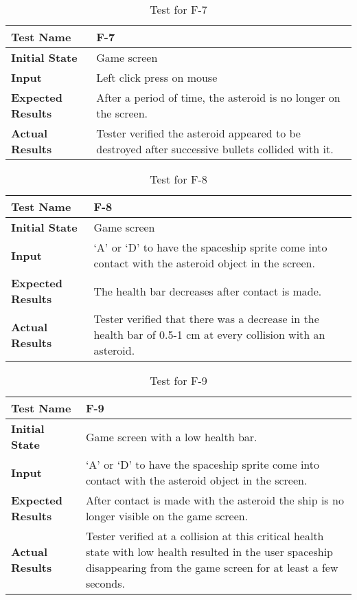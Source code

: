 \documentclass[12pt, titlepage]{article}
\begin{document}
\begin{table}[!htbp]
\begin{tabular}[r]{|l|l|}\hline
\textbf{Test Name} & F-7 \\ \hline
\textbf{Initial State} &   Game screen\\ \hline
\textbf{Input} &Left click press on mouse\\ \hline 
\textbf{Expected Results} &After a period of time, the asteroid is no longer on the screen. \\ \hline
\textbf{Actual Results} & Tester verified the asteroid appeared to be destroyed after successive bullets collided with it.\\ \hline            
\end{tabular}
\caption{Test for F-7}
\label{Table}
\end{table}

\begin{table}[!htbp]
\begin{tabular}[r]{|l|l|}\hline
\textbf{Test Name} & F-8 \\ \hline
\textbf{Initial State} &   Game screen\\ \hline
\textbf{Input} &`A' or `D' to have the spaceship sprite come into contact with the asteroid object in the screen.\\ \hline 
\textbf{Expected Results} &The health bar decreases after contact is made. \\ \hline
\textbf{Actual Results} & Tester verified that there was a decrease in the health bar of 0.5-1 cm at every collision with an asteroid.\\ \hline            
\end{tabular}
\caption{Test for F-8}
\label{Table}
\end{table}

\begin{table}[!htbp]
\begin{tabular}[r]{|l|l|}\hline
\textbf{Test Name} & F-9\\ \hline
\textbf{Initial State} &   Game screen with a low health bar.\\ \hline
\textbf{Input} &`A' or `D' to have the spaceship sprite come into contact with the asteroid object in the screen.\\ \hline 
\textbf{Expected Results} &After contact is made with the asteroid the ship is no longer visible on the game screen. \\ \hline
\textbf{Actual Results} & Tester verified at a collision at this critical health state with low health resulted in the user spaceship disappearing from the game screen for at least a few seconds.\\ \hline            
\end{tabular}
\caption{Test for F-9}
\label{Table}
\end{table}
\end{document}
